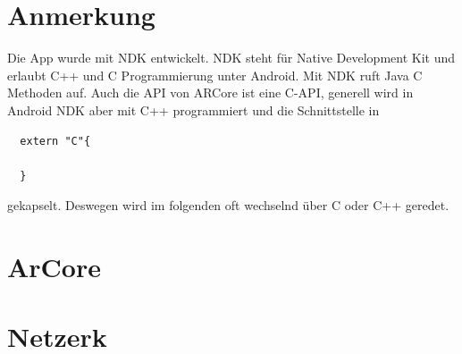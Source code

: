 \section{Anmerkung}
Die App wurde mit NDK entwickelt. NDK steht für Native Development Kit und erlaubt C++ und C Programmierung unter Android.
Mit NDK ruft Java C Methoden auf. Auch die API von ARCore ist eine C-API, generell wird in Android NDK aber mit C++ programmiert und die Schnittstelle in
\begin{verbatim}
  extern "C"{

  }
\end{verbatim}
gekapselt. Deswegen wird im folgenden oft wechselnd über C oder C++ geredet.

\section{ArCore}


\section{Netzerk}

